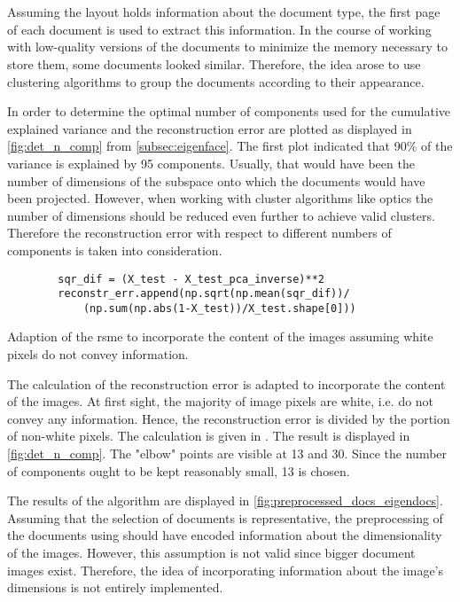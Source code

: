 \section{\eigendocs{}}\label{sec:evaluation-eigendocs}
Assuming the layout holds information about the document type, the first page of each document is used to extract this information.
In the course of working with low-quality versions of the documents to minimize the memory necessary to store them, some documents looked similar.
Therefore, the idea arose to use clustering algorithms to group the documents according to their appearance.

In order to determine the optimal number of components used for \eigendocs{} the cumulative explained variance and the reconstruction error are plotted 
as displayed in \autoref{fig:det_n_comp} from \autoref{subsec:eigenface}.
The first plot indicated that 90\% of the variance is explained by 95 components.
Usually, that would have been the number of dimensions of the subspace onto which the documents would have been projected.
However, when working with cluster algorithms like \ac{optics} the number of dimensions should be reduced even further to achieve valid clusters.
Therefore the reconstruction error with respect to different numbers of components is taken into consideration.

\begin{listing}[htp]
    \begin{verbatim}
        sqr_dif = (X_test - X_test_pca_inverse)**2
        reconstr_err.append(np.sqrt(np.mean(sqr_dif))/
            (np.sum(np.abs(1-X_test))/X_test.shape[0])) 
    \end{verbatim}
    \caption[Adaption of the \ac{rsme}]{
        Adaption of the \ac{rsme} to incorporate the content of the images assuming white pixels do not convey information.
    }
    \label{lst:impl-weighted-rsme}
\end{listing}

The calculation of the reconstruction error is adapted to incorporate the content of the images.
At first sight, the majority of image pixels are white, i.e. do not convey any information.
Hence, the reconstruction error is divided by the portion of non-white pixels. 
The calculation is given in .
The result is displayed in \autoref{fig:det_n_comp}.
The "elbow" points are visible at 13 and 30.
Since the number of components ought to be kept reasonably small, 13 is chosen.


The results of the \eigendocs{} algorithm are displayed in \autoref{fig:preprocessed_docs_eigendocs}.
Assuming that the selection of documents is representative, 
the preprocessing of the documents using \eigendocs{} should have encoded information about the dimensionality of the images.
However, this assumption is not valid since bigger document images exist.
Therefore, the idea of incorporating information about the image's dimensions is not entirely implemented.